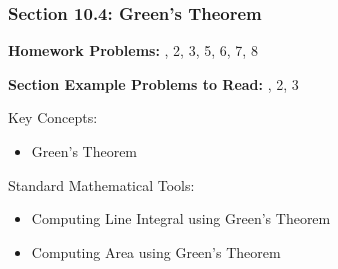 %
% 

\begin{frame}
\frametitle{\Large {\color[rgb]{0.02,0.20,1.0} Section 10.4: Green's Theorem}}
\scriptsize

\vspace{0.2cm}
{\bf Homework Problems:} , 2, 3, 5, 6, 7, 8

\vspace{0.2cm}

{\bf Section Example Problems to Read:} , 2, 3

\vspace{1.2cm}

\begin{block}{Key Concepts:}
\begin{itemize}
	\item[...] Green's Theorem
\end{itemize}
\end{block}

\begin{block}{Standard Mathematical Tools:}
\begin{itemize}
	\item[...] Computing Line Integral using Green's Theorem
	\item[...] Computing Area using Green's Theorem
\end{itemize}
\end{block}

\end{frame}

